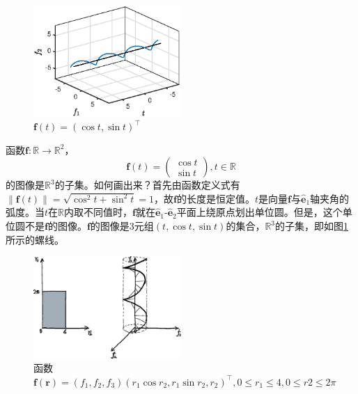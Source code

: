 \documentclass[main.tex]{subfiles}
\begin{document}
\begin{figure}[h]
    \centering
    \includegraphics[width=0.5\textwidth]{images/II.10.3.eps}
    \caption{$\mathbf{f}\left(t\right)=\left(\cos t,\sin t\right)^\intercal$}
    \label{fig:II.10.3}
\end{figure}

\begin{example}\label{exp:II.12.6}
    函数$\mathbf{f}:\mathbb{R}\rightarrow\mathbb{R}^2$，
\[
\mathbf{f}\left(t\right)=\left(\begin{array}{c}\cos t\\\sin t\end{array}\right),t\in\mathbb{R}
\]
的图像是$\mathbb{R}^3$的子集。如何画出来？首先由函数定义式有$\left\|\mathbf{f}\left(t\right)\right\|=\sqrt{\cos^2t+\sin^2t}=1$，故$\mathbf{f}$的长度是恒定值。$t$是向量$\mathbf{f}$与$\mathbf{\hat{e}}_1$轴夹角的弧度。当$t$在$\mathbb{R}$内取不同值时，$\mathbf{f}$就在$\mathbf{\hat{e}}_1$-$\mathbf{\hat{e}}_2$平面上绕原点划出单位圆。但是，这个单位圆不是$\mathbf{f}$的图像。$\mathbf{f}$的图像是3元组$\left(t,\cos t,\sin t\right)$的集合，$\mathbb{R}^3$的子集，即如图\ref{fig:II.10.3}所示的螺线。
\end{example}

\begin{figure}[h]
    \centering
    \includegraphics[width=0.5\textwidth]{images/II.10.4.eps}
    \caption{函数$\mathbf{f}\left(\mathbf{r}\right)=\left(f_1,f_2,f_3\right)\left(r_1\cos r_2, r_1\sin r_2,r_2\right)^\intercal,0\leq r_1\leq 4,0\leq r2\leq 2\pi$}
    \label{fig:II.10.4}
\end{figure}
\end{document}

